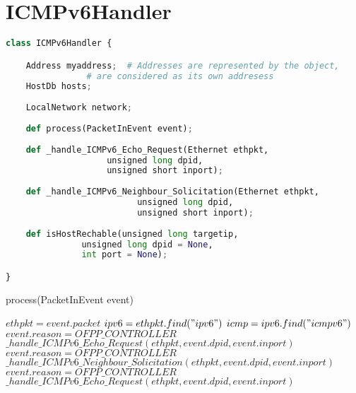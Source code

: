 \documentclass[10pt,a4paper,titlepage]{report}
\begin{document}
\section{ICMPv6Handler}
\begin{lstlisting}[language=Python]
class ICMPv6Handler {

	Address myaddress;	# Addresses are represented by the object,
				# are considered as its own addresess
	HostDb hosts;
	
	LocalNetwork network;
	
	def process(PacketInEvent event);
	
	def _handle_ICMPv6_Echo_Request(Ethernet ethpkt, 
					unsigned long dpid, 
					unsigned short inport);
	
	def _handle_ICMPv6_Neighbour_Solicitation(Ethernet ethpkt, 
						  unsigned long dpid, 
						  unsigned short inport);
	
	def isHostRechable(unsigned long targetip, 
			   unsigned long dpid = None, 
			   int port = None);

}
\end{lstlisting}

\begin{algorithm}
	\caption{process(PacketInEvent event)}
	\begin{algorithmic}[1]
		\STATE $ethpkt = event.packet$
		\STATE $ipv6 = ethpkt.find("ipv6")$
		\STATE $icmp = ipv6.find("icmpv6")$
				\STATE $event.reason = OFPP\_CONTROLLER$
				\STATE $\_handle\_ICMPv6\_Echo\_Request(ethpkt, event.dpid, event.inport)$
			\ENDIF
				\STATE $event.reason = OFPP\_CONTROLLER$
				\STATE $\_handle\_ICMPv6\_Neighbour\_Solicitation(ethpkt, event.dpid, event.inport)$
			\ENDIF
			\STATE $event.reason = OFPP\_CONTROLLER$
			\STATE $\_handle\_ICMPv6\_Echo\_Request(ethpkt, event.dpid, event.inport)$
		\ENDIF
	\end{algorithmic}
\end{algorithm}
\end{document}
